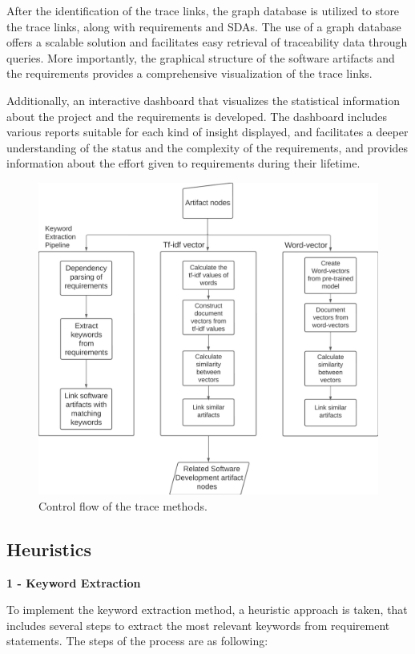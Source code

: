 \documentclass[conference]{IEEEtran}
\begin{document}
After the identification of the trace links, the graph database is utilized to store the trace links, along with requirements and SDAs. The use of a graph database offers a scalable solution and facilitates easy retrieval of traceability data through queries. More importantly, the graphical structure of the software artifacts and the requirements provides a comprehensive visualization of the trace links.

Additionally, an interactive dashboard that visualizes the statistical information about the project and the requirements is developed. The dashboard includes various reports suitable for each kind of insight displayed, and facilitates a deeper understanding of the status and the complexity of the requirements, and provides information about the effort given to requirements during their lifetime.

\begin{figure}[htb]
    \centering
    \includegraphics[width=0.6\linewidth]{figs/tracemethods.png}
    \caption{Control flow of the trace methods.}
    \label{fig:trace-methods}
\end{figure}

\subsection{Heuristics}
\label{sec:heuristics} 

\textbf{1 - Keyword Extraction}

To implement the keyword extraction method, a heuristic approach is taken, that includes several steps to extract the most relevant keywords from requirement statements. The steps of the process are as following:
\end{document}
